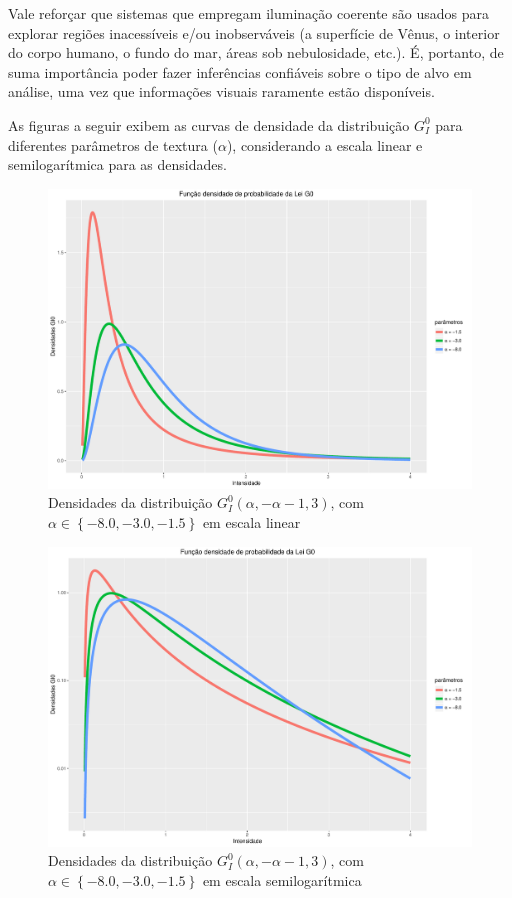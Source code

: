 Vale reforçar que sistemas que empregam iluminação coerente são usados para explorar regiões inacessíveis e/ou inobserváveis (a superfície de Vênus, o interior do corpo humano, o fundo do mar, áreas sob nebulosidade, etc.). É, portanto, de suma importância poder fazer inferências confiáveis sobre o tipo de alvo em análise, uma vez que informações visuais raramente estão disponíveis.

As figuras a seguir exibem as curvas de densidade da distribuição $G_I^0$ para diferentes parâmetros de textura ($\alpha$), considerando a escala linear e semilogarítmica para as densidades.
\begin{figure}[H]
     \centering
     \includegraphics[scale=0.5]{plots/GI0Densities.pdf}
     \caption{Densidades da distribuição $G_I^0(\alpha, -\alpha - 1, 3)$, com $\alpha \in \left \{  -8.0, -3.0, -1.5 \right \}$ em escala linear}
     \label{graf_densGI0}
\end{figure}
\begin{figure}[H]
     \centering
     \includegraphics[scale=0.5]{plots/GI0DensitiesSemiLog.pdf}
     \caption{Densidades da distribuição $G_I^0(\alpha, -\alpha - 1, 3)$, com $\alpha \in \left \{  -8.0, -3.0, -1.5 \right \}$ em escala semilogarítmica}
     \label{graf_densGI0_Log}
\end{figure}

